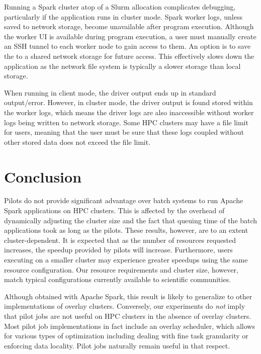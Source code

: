     Running a Spark cluster atop of a Slurm allocation complicates debugging, particularly if the application runs in cluster mode.
    Spark worker logs, unless saved to network storage, become unavailable after program execution.
    Although the worker UI is available during program execution, a user must manually create an SSH tunnel
    to each worker node to gain access to them.
    An option is to save the to a shared network storage for future access. This effectively slows down
    the application as the network file system is typically a slower storage than local storage.
    
    When running in client mode, the driver output ends up in standard output/error. 
    However, in cluster mode, the driver output is found stored within
    the worker logs, which means the driver logs are also inaccessible without 
    worker logs being written to network storage. Some HPC clusters
    may have a file limit for users, meaning that the user must be sure that these 
    logs coupled without other stored data does not exceed the file
    limit.  
    
    \section{Conclusion}\label{spa:sec:conclusion}
    Pilots do not provide significant advantage over batch systems to run
    Apache Spark applications on HPC clusters. This is affected by the overhead of dynamically
    adjusting the cluster size and the fact that queuing time of the batch
    applications took as long as the pilots. These results, however, are to an
    extent cluster-dependent. It is expected that as the number of resources
    requested increases, the speedup provided by pilots will increase.
    Furthermore, users executing on a smaller cluster may experience greater
    speedups using the same resource configuration. Our resource requirements
    and cluster size, however, match typical configurations currently available
    to scientific communities.
    
    Although obtained with Apache Spark, this result is likely to generalize to
    other implementations of overlay clusters. Conversely, our experiments do
    \emph{not} imply that pilot jobs are not useful on HPC clusters in the
    absence of overlay clusters. Most pilot job implementations in fact include
    an overlay scheduler, which allows for various types of optimization
    including dealing with fine task granularity or enforcing data locality.
    Pilot jobs naturally remain useful in that respect.
    
